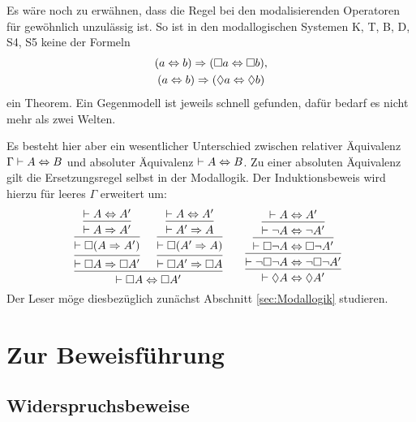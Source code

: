 \noindent
Es wäre noch zu erwähnen, dass die Regel bei den modalisierenden
Operatoren für gewöhnlich unzulässig ist. So ist in den modallogischen
Systemen K, T, B, D, S4, S5 keine der Formeln
\begin{gather*}
(a\Leftrightarrow b)\Rightarrow (\Box a\Leftrightarrow\Box b),\\
(a\Leftrightarrow b)\Rightarrow (\Diamond a\Leftrightarrow\Diamond b)
\end{gather*}
ein Theorem. Ein Gegenmodell ist jeweils schnell gefunden, dafür
bedarf es nicht mehr als zwei Welten.

Es besteht hier aber ein wesentlicher Unterschied zwischen relativer
Äquivalenz $\Gamma\vdash A\Leftrightarrow B$ und absoluter Äquivalenz
$\vdash A\Leftrightarrow B$. Zu einer absoluten Äquivalenz gilt die Ersetzungsregel
selbst in der Modallogik. Der Induktionsbeweis wird hierzu für leeres
$\Gamma$ erweitert um:
\[
\begin{array}{@{}l@{\qquad}l}
\begin{prooftree}
        \hypo{\vdash A\bicond A'}
      \infer1{\vdash A\cond A'}
    \infer1{\vdash\lnec(A\cond A')}
  \infer1{\vdash\lnec A\cond\lnec A'}
        \hypo{\vdash A\bicond A'}
      \infer1{\vdash A'\cond A}
    \infer1{\vdash\lnec(A'\cond A)}
  \infer1{\vdash\lnec A'\cond\lnec A}
\infer2{\vdash\lnec A\bicond\lnec A'}
\end{prooftree}
&
\begin{prooftree}
        \hypo{\vdash A\bicond A'}
      \infer1{\vdash\lnot A\bicond\lnot A'}
    \infer1{\vdash\lnec\lnot A\bicond\lnec\lnot A'}
  \infer1{\vdash\lnot\lnec\lnot A\bicond\lnot\lnec\lnot A'}
\infer1{\vdash\lpos A\bicond\lpos A'}
\end{prooftree}
\end{array}
\]
Der Leser möge diesbezüglich zunächst Abschnitt \ref{sec:Modallogik} studieren.

\section{Zur Beweisführung}

\subsection{Widerspruchsbeweise}

